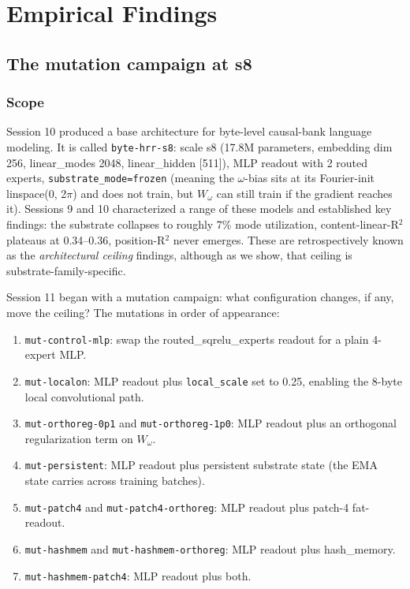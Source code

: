 \documentclass[11pt,openany]{book}
\begin{document}
\part{Empirical Findings}

\chapter{The mutation campaign at s8}

\section{Scope}

Session 10 produced a base architecture for byte-level causal-bank
language modeling. It is called \texttt{byte-hrr-s8}: scale s8
(17.8M parameters, embedding dim 256, linear\_modes 2048,
linear\_hidden [511]), MLP readout with 2 routed experts,
\texttt{substrate\_mode=frozen} (meaning the $\omega$-bias sits at
its Fourier-init linspace(0, 2$\pi$) and does not train, but
$W_\omega$ can still train if the gradient reaches it). Sessions 9
and 10 characterized a range of these models and established key
findings: the substrate collapses to roughly 7\% mode utilization,
content-linear-R$^2$ plateaus at 0.34--0.36, position-R$^2$ never
emerges. These are retrospectively known as the \emph{architectural
ceiling} findings, although as we show, that ceiling is
substrate-family-specific.

Session 11 began with a mutation campaign: what configuration changes,
if any, move the ceiling? The mutations in order of appearance:

\begin{enumerate}
  \item \texttt{mut-control-mlp}: swap the routed\_sqrelu\_experts
  readout for a plain 4-expert MLP.
  \item \texttt{mut-localon}: MLP readout plus \texttt{local\_scale}
  set to 0.25, enabling the 8-byte local convolutional path.
  \item \texttt{mut-orthoreg-0p1} and \texttt{mut-orthoreg-1p0}: MLP
  readout plus an orthogonal regularization term on $W_\omega$.
  \item \texttt{mut-persistent}: MLP readout plus persistent substrate
  state (the EMA state carries across training batches).
  \item \texttt{mut-patch4} and \texttt{mut-patch4-orthoreg}: MLP
  readout plus patch-4 fat-readout.
  \item \texttt{mut-hashmem} and \texttt{mut-hashmem-orthoreg}: MLP
  readout plus hash\_memory.
  \item \texttt{mut-hashmem-patch4}: MLP readout plus both.
\end{enumerate}
\end{document}
